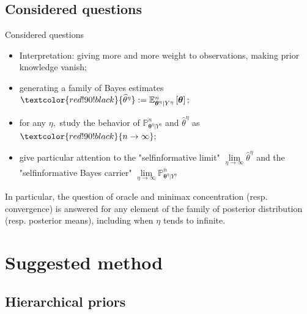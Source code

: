 \documentclass[10pt]{beamer}
\begin{document}
\subsection{Considered questions}
\begin{frame}{Considered questions}
\begin{itemize}
\item Interpretation: giving more and more weight to observations, making prior knowledge vanish;
\item generating a family of Bayes estimates $\textcolor{red!90!black}{\widehat{\theta}^{\eta}} := \mathbb{E}_{\boldsymbol{\theta}^{\eta} \vert Y^{\eta}}^{n} \left[\boldsymbol{\theta}\right];$
\item for any $\eta,$ study the behavior of $\mathbb{P}_{\boldsymbol{\theta}^{\eta} \vert Y^{\eta}}^{n}$ and $\widehat{\theta}^{\eta}$ as $\textcolor{red!90!black}{n \rightarrow \infty};$
\item give particular attention to the \textcolor{red!90!black}{"selfinformative limit"} $\lim\limits_{\eta \rightarrow \infty} \widehat{\theta}^{\eta}$ and the \textcolor{red!90!black}{"selfinformative Bayes carrier"}  $\lim\limits_{\eta \rightarrow \infty} \mathbb{P}_{\boldsymbol{\theta}^{\eta} \vert Y^{\eta}}^{n}$
\end{itemize}

In particular, the question of \textcolor{red!90!black}{oracle and minimax} concentration (resp. convergence) is answered for any element of the family of posterior distribution (resp. posterior means), including when $\eta$ tends to infinite.

\end{frame}

\section{Suggested method}
\subsection{Hierarchical priors}
\end{document}
